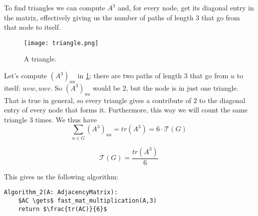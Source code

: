 To find triangles we can compute $A^3$ and, for every node, get its diagonal entry in the matrix, effectively giving us the number of paths of length $3$ that go from that node to itself.
%
\begin{figure}[h!]
	\centering
	\texttt{[image: triangle.png]}
	\caption{A triangle.}\label{fig:triangle-graph}
\end{figure}
% 
Let's compute $(A^3)_{uu}$ in \cref{fig:triangle-graph}; there are two paths of length $3$ that go from $u$ to itself: $uvw, uwv$. So $(A^3)_{uu}$ would be $2$, but the node is in just one triangle.
That is true in general, so every triangle gives a contribute of $2$ to the diagonal entry of every node that forms it. Furthermore, this way we will count the same triangle $3$ times. We thus have
\[
	\sum_{u \in G}{\left(A^3\right)_{uu}} = tr(A^3) = 6 \cdot \mathcal{T}(G)
\]
\begin{thm}
	$$\mathcal{T}(G) = \frac{tr(A^3)}{6}$$
\end{thm}

This gives us the following algorithm:
\begin{lstlisting}[caption={Algorithm 2}, label={alg:triangles-alg2}]
Algorithm_2(A: AdjacencyMatrix):
    $AC \gets$ fast_mat_multiplication(A,3)
    return $\frac{tr(AC)}{6}$
\end{lstlisting}